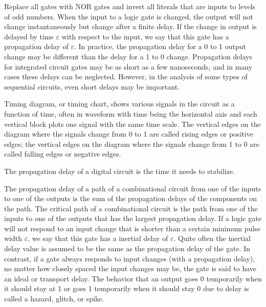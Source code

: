 \documentclass[a4paper,12pt]{report}
\begin{document}
\item Replace all gates with NOR gates and invert all literals that are inputs to levels of odd numbers.
\een
{}
When the input to a logic gate is changed, the output will not change instantaneously but change after a finite delay. If the change in output is delayed by time $\varepsilon$ with respect to the input, we say that this gate has a propagation delay of $\varepsilon$. In practice, the propagation delay for a 0 to 1 output change may be different than the delay for a 1 to 0 change. Propagation delays for integrated circuit gates may be as short as a few nanoseconds, and in many cases these delays can be neglected. However, in the analysis of some types of sequential circuits, even short delays may be important.

Timing diagram, or timing chart, shows various signals in the circuit as a function of time, often in waveform with time being the horizontal axis and each vertical block plots one signal with the same time scale. The vertical edges on the diagram where the signals change from 0 to 1 are called rising edges or positive edges; the vertical edges on the diagram where the signals change from 1 to 0 are called falling edges or negative edges.

The propagation delay of a digital circuit is the time it needs to stabilize.

The propagation delay of a path of a combinational circuit from one of the inputs to one of the outputs is the sum of the propagation delays of the components on the path. The critical path of a combinational circuit is the path from one of the inputs to one of the outputs that has the largest propagation delay.
If a logic gate will not respond to an input change that is shorter than a certain minimum pulse width $\varepsilon$, we say that this gate has a inertial delay of $\varepsilon$. Quite often the inertial delay value is assumed to be the same as the propagation delay of the gate. In contrast, if a gate always responds to input changes (with a propagation delay), no matter how closely spaced the input changes may be, the gate is said to have an ideal or transport delay.
The behavior that an output goes 0 temporarily when it should stay at 1 or goes 1 temporarily when it should stay 0 due to delay is called a hazard, glitch, or spike.
\end{document}
